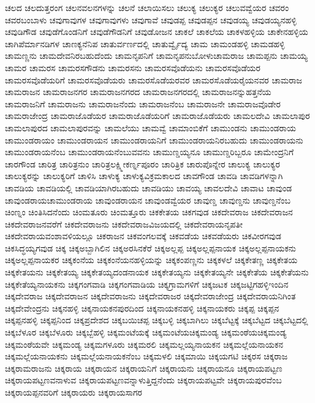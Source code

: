 {ಚಲದ
ಚಲದುತ್ತರಂಗ
ಚಲನವಲನಗಳನ್ನು
ಚಲನೆ
ಚಲಾಯಿಸಲು
ಚಲುಕ್ಯ
ಚಲುಕ್ಯರ
ಚಲುವವ್ವೆಯರ
ಚವರಂ
ಚವರಬಂಬಾಳು
ಚವುಗಾವುಗಳ
ಚವುಗಾವುಗಳು
ಚವುಗಾವೆ
ಚವುಡಪ್ಪ
ಚವುಡಪ್ಪನ
ಚವುಡಯ್ಯ
ಚವುಡಯ್ಯನಹಳ್ಳಿ
ಚವುಡಿಗೌಡ
ಚವುಡೆಗೊಂಡನಿಗೆ
ಚವುಡೆಗೌಡನಿಗೆ
ಚವುಡೋಜನ
ಚಾಕಲೆ
ಚಾಕಲೆಯ
ಚಾಕಳಹಳ್ಳಿಯ
ಚಾಕೇನಹಳ್ಳಿಯ
ಚಾಗಿಪೆರ್ಮಾನಡಿಗಳ
ಚಾಣಕ್ಯನೆನಿಪ
ಚಾತುರ್ವರ್ಣದಲ್ಲಿ
ಚಾತುರ್ವ್ವೈದ್ಯ
ಚಾಮ
ಚಾಮಂಡಹಳ್ಳಿ
ಚಾಮಡಹಳ್ಳಿ
ಚಾಮಣ್ಣನು
ಚಾಮದೇವನಿರಬಹುದೆಂದು
ಚಾಮನೃಪನಿಗೆ
ಚಾಮನೃಪನುಬೋಳುಚಾಮರಾಜ
ಚಾಮಪ್ಪನು
ಚಾಮಯ್ಯ
ಚಾಮರ
ಚಾಮರಸ
ಚಾಮರಸಗೌಡನು
ಚಾಮರಸನು
ಚಾಮರಸವೊಡೆಯನು
ಚಾಮರಸವೊಡೆಯರ
ಚಾಮರಸವೊಡೆಯರಿಗೆ
ಚಾಮರಸವೊಡೆಯರು
ಚಾಮರಸೊಡೆಯರವರ
ಚಾಮರಸೊಡೆಯರೈಯನವರ
ಚಾಮರಾಜ
ಚಾಮರಾಜನ
ಚಾಮರಾಜನಗರ
ಚಾಮರಾಜನಗರದ
ಚಾಮರಾಜನಗರದಲ್ಲಿ
ಚಾಮರಾಜನನ್ನುಹತ್ತನೆಯ
ಚಾಮರಾಜನಿಗೆ
ಚಾಮರಾಜನು
ಚಾಮರಾಜನೆಂದು
ಚಾಮರಾಜನೆಂಬ
ಚಾಮರಾಜನೇ
ಚಾಮರಾಜವೊಡೇರ
ಚಾಮರಾಜೇಂದ್ರ
ಚಾಮರಾಜೊಡೆಯರ
ಚಾಮರಾಜೊಡೆಯರಿಗೆ
ಚಾಮರಾಜೊಡೆಯರು
ಚಾಮಲದೇವಿ
ಚಾಮಲಾಪುರ
ಚಾಮಲಾಪುರದ
ಚಾಮಲಾಪುರವನ್ನು
ಚಾಮಲೆಯು
ಚಾಮವ್ವೆ
ಚಾಮಾಂಬಿಕೆಗೆ
ಚಾಮುಂಡನು
ಚಾಮುಂಡರಾಯ
ಚಾಮುಂಡರಾಯಂ
ಚಾಮುಂಡರಾಯನ
ಚಾಮುಂಡರಾಯನಿಗೆ
ಚಾಮುಂಡರಾಯನಿರಬಹುದು
ಚಾಮುಂಡರಾಯನು
ಚಾಮುಂಡರಾಯನೆಂಬ
ಚಾಮುಂಡರಾಯನೆಂಬುವವನು
ಚಾಮುಣ್ಡಯ್ಯನೂ
ಚಾಮುಣ್ಡರಿಬ್ಬರೂ
ಚಾಮೇಂದ್ರನಿಗೆ
ಚಾರಗೌಂಡ
ಚಾರಿತ್ರ
ಚಾರಿತ್ರನುಂ
ಚಾರಿತ್ರಲಕ್ಷ್ಮೀಕರ್ಣ್ನಪೂರಂ
ಚಾರಿತ್ರಿಕ
ಚಾರುಪೊನ್ನೇರ
ಚಾಲುಕ್ಯ
ಚಾಲುಕ್ಯರ
ಚಾಲುಕ್ಯರನ್ನು
ಚಾಲುಕ್ಯರಿಗೆ
ಚಾಳಿಸಿ
ಚಾಳುಕ್ಯ
ಚಾಳುಕ್ಯವಿಕ್ರಮಕಾಲದ
ಚಾವಗೌಂಡ
ಚಾವಡಿ
ಚಾವಡಿಗಳನ್ನಾಗಿ
ಚಾವಡಿಯ
ಚಾವಡಿಯಲ್ಲಿ
ಚಾವಡಿಯಾಗಿರಬಹುದು
ಚಾವಡಿಯು
ಚಾವಯ್ಯ
ಚಾವಲದೇವಿ
ಚಾವಾಟ
ಚಾವುಂಡ
ಚಾವುಂಡರಾಯಚಾಮುಂಡರಾಯ
ಚಾವುಂಡರಾಯನ
ಚಾವುಂಡವ್ವೆಯರ
ಚಾವುಣ್ಡ
ಚಾವುಣ್ಡನು
ಚಾವುಣ್ಡನೆಂಬ
ಚಿಂಣ್ನಂ
ಚಿಂತಿಸಿದನೆಂದು
ಚಿಂಮತೂರು
ಚಿಂಮತ್ತೂರು
ಚಿಕಕೇತಯ
ಚಿಕಗವುಡ
ಚಿಕದೇವರಾಜ
ಚಿಕದೇವರಾಜನ
ಚಿಕದೇವರಾಜನವರೆಗೆ
ಚಿಕದೇವರಾಜನು
ಚಿಕದೇವರಾಜವಿಜಯದಲ್ಲಿ
ಚಿಕದೇವರಾಯನೃಪತೀ
ಚಿಕದೇವರಾಯವಂಶಾವಳಿಯಲ್ಲೂ
ಚಿಕರಾಜನ
ಚಿಕವಂಗಲವಕ್ಕೆ
ಚಿಕವಡೆಯ
ಚಿಕವಡೆಯರು
ಚಿಕವೀರಗವುಡ
ಚಿಕಸಿದ್ಧಯ್ಯಗವುಡ
ಚಿಕ್ಕ
ಚಿಕ್ಕಅಬ್ಬಾಗಿಲಿನ
ಚಿಕ್ಕಅರಸಿನಕೆರೆ
ಚಿಕ್ಕಅಲ್ಲಪ್ಪ
ಚಿಕ್ಕಅಲ್ಲಪ್ಪನಾಯಕ
ಚಿಕ್ಕಅಲ್ಲಪ್ಪನಾಯಕನು
ಚಿಕ್ಕಅಲ್ಲಪ್ಪನಾಯಕರ
ಚಿಕ್ಕಕಂನೆಯ
ಚಿಕ್ಕಕಂನೆಯನಹಳ್ಳಿಯನ್ನು
ಚಿಕ್ಕಕಂಪಣ್ಣನು
ಚಿಕ್ಕಕಳಲೆ
ಚಿಕ್ಕಕೇತಣ್ಣ
ಚಿಕ್ಕಕೇತಯ
ಚಿಕ್ಕಕೇತಯನು
ಚಿಕ್ಕಕೇತಯ್ಯ
ಚಿಕ್ಕಕೇತಯ್ಯದಂಡನಾಯಕ
ಚಿಕ್ಕಕೇತಯ್ಯನು
ಚಿಕ್ಕಕೇತಯ್ಯನೇ
ಚಿಕ್ಕಕೇತೆಯ
ಚಿಕ್ಕಕೇತೆಯನು
ಚಿಕ್ಕಕೇತೆಯ್ಯನಾಯಕನು
ಚಿಕ್ಕಗಂಗವಾಡಿ
ಚಿಕ್ಕಗಂಗವಾಡಿಯ
ಚಿಕ್ಕಗ್ರಾಮಗಳಿಗೆ
ಚಿಕ್ಕಜಟಕ
ಚಿಕ್ಕಜಟ್ಟಿಗಹಳ್ಳಿಇಂದಿನ
ಚಿಕ್ಕದೇವರಾಜ
ಚಿಕ್ಕದೇವರಾಜನ
ಚಿಕ್ಕದೇವರಾಜನು
ಚಿಕ್ಕದೇವರಾಜರ
ಚಿಕ್ಕದೇವರಾಜೇಂದ್ರ
ಚಿಕ್ಕದೇವರಾಯನಿಗಿಂತ
ಚಿಕ್ಕದೇವೇಂದ್ರನು
ಚಿಕ್ಕನಹಳ್ಳಿ
ಚಿಕ್ಕನಾಯಕನಪುರದಿಂದ
ಚಿಕ್ಕನಾಯಕನಹಳ್ಳಿ
ಚಿಕ್ಕನಾಯಕರು
ಚಿಕ್ಕಪ್ಪ
ಚಿಕ್ಕಪ್ಪನ
ಚಿಕ್ಕಪ್ಪನಹಳ್ಳಿ
ಚಿಕ್ಕಪ್ಪನಿಂದ
ಚಿಕ್ಕಪ್ರದೇಶದ
ಚಿಕ್ಕಬಯಿಚಪ್ಪ
ಚಿಕ್ಕಬಳ್ಳಿ
ಚಿಕ್ಕಬಾಗಿಲು
ಚಿಕ್ಕಬೆಟ್ಟಕ್ಕೆ
ಚಿಕ್ಕಬೆಟ್ಟದ
ಚಿಕ್ಕಬೆಟ್ಟದಲ್ಲಿ
ಚಿಕ್ಕಬೆಳೂರ
ಚಿಕ್ಕಬೆಳೂರು
ಚಿಕ್ಕಬ್ಬೆಹಳ್ಳಿ
ಚಿಕ್ಕಮಂಟೆಯಕ್ಕೆ
ಚಿಕ್ಕಮಂಟೆಯಚಿಕ್ಕಮಂಡ್ಯ
ಚಿಕ್ಕಮಂಠೆಯಚಿಕ್ಕಮಂಡ್ಯ
ಚಿಕ್ಕಮಂಠೆಯವೇ
ಚಿಕ್ಕಮಂಡ್ಯ
ಚಿಕ್ಕಮಗಳೂರು
ಚಿಕ್ಕಮರಲಿ
ಚಿಕ್ಕಮಲ್ಲಯ್ಯನಾಯಕನ
ಚಿಕ್ಕಮಲ್ಲೆಯನಾಯಕನ
ಚಿಕ್ಕಮಲ್ಲೆಯನಾಯಕನು
ಚಿಕ್ಕಮಲ್ಲೆಯನಾಯಕನೆಂಬ
ಚಿಕ್ಕಮಳಲಿ
ಚಿಕ್ಕಮಾಯಿ
ಚಿಕ್ಕಯಗಟಿ
ಚಿಕ್ಕರಸ
ಚಿಕ್ಕರಾಜ
ಚಿಕ್ಕರಾಮರಾಜನು
ಚಿಕ್ಕರಾಯ
ಚಿಕ್ಕರಾಯನ
ಚಿಕ್ಕರಾಯನಿಗೆ
ಚಿಕ್ಕರಾಯನು
ಚಿಕ್ಕರಾಯನೂ
ಚಿಕ್ಕರಾಯಪಟ್ಟಣ
ಚಿಕ್ಕರಾಯಪಟ್ಟಣವನಾಳುವ
ಚಿಕ್ಕರಾಯಪಟ್ಟಣವನ್ನಾಳುತ್ತಿದ್ದನೆಂದು
ಚಿಕ್ಕರಾಯಪಟ್ಟವೇ
ಚಿಕ್ಕರಾಯಪುರವೆಂಬ
ಚಿಕ್ಕರಾಯಪ್ಪನವರಿಗೆ
ಚಿಕ್ಕರಾಯರು
ಚಿಕ್ಕರಾಯಸಾಗರ
}

